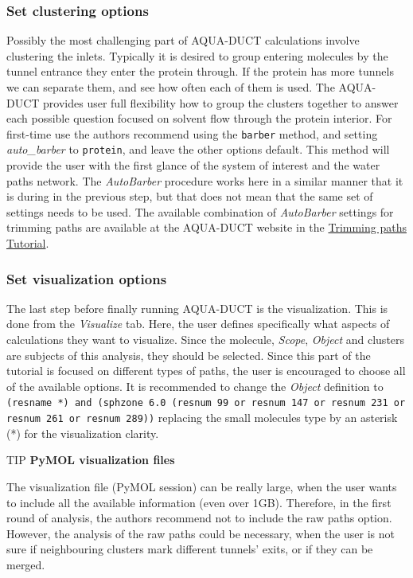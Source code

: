 \documentclass[9pt,tutorial]{livecoms}
\begin{document}
\subsubsection{Set clustering options}
Possibly the most challenging part of AQUA-DUCT calculations involve clustering the inlets. Typically it is desired to group entering molecules by the tunnel entrance they enter the protein through. If the protein has more tunnels we can separate them, and see how often each of them is used. The AQUA-DUCT provides user full flexibility how to group the clusters together to answer each possible question focused on solvent flow through the protein interior.  
For first-time use the authors recommend using the \texttt{barber} method, and setting \emph{auto\_barber} to \texttt{protein}, and leave the other options default. This method will provide the user with the first glance of the system of interest and the water paths network. The \emph{AutoBarber} procedure works here in a similar manner that it is during in the previous step, but that does not mean that the same set of settings needs to be used. The available combination of \emph{AutoBarber} settings for trimming paths are available at the AQUA-DUCT website in the \href{http://www.aquaduct.pl/trimming-paths/}{Trimming paths Tutorial}.

\subsubsection{Set visualization options}
The last step before finally running AQUA-DUCT is the visualization. This is done from the \textit{Visualize} tab. Here, the user defines specifically what aspects of calculations they want to visualize. Since the  molecule, \emph{Scope}, \emph{Object} and clusters are subjects of this analysis, they should be selected. Since this part of the tutorial is focused on different types of paths, the user is encouraged to choose all of the available options. It is recommended to change the \emph{Object} definition to \texttt{(resname *) and (sphzone 6.0 (resnum 99 or resnum 147 or resnum 231 or resnum 261 or resnum 289))} replacing the small molecules type by an asterisk (*) for the visualization clarity.

\begin{Checklists}
\begin{checklist}{TIP}
\textbf{PyMOL visualization files}

The visualization file (PyMOL session) can be really large, when the user wants to include all the available information (even over 1GB). Therefore, in the first round of analysis, the authors recommend not to include the raw paths option. However, the analysis of the raw paths could be necessary, when the user is not sure if neighbouring clusters mark different tunnels’ exits, or if they can be merged.
\end{checklist}
\end{Checklists}
\end{document}
